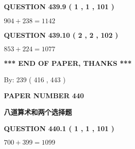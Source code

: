 \documentclass{ctexart}
\begin{document}
 
  
\vspace{0.2in}
  
{\textbf{\Large{QUESTION
439.9 
 ( 1 , 1 , 101 )
}}}
  
  
 
 

$ %
904 +  %
238=   %
1142$
 
 
  
\vspace{0.2in}
  
{\textbf{\Large{QUESTION
439.10 
 ( 2 , 2 , 102 )
}}}
  
  
 
 

$ %
853 +  %
224=   %
1077$
 
 
   
   
 \vspace{0.2in}
 
   
   
   
   
\vspace{1.0in} 
{\textbf{\large{ *** END OF PAPER, THANKS *** }}} 
   
   
\hspace{1.0in} By: 
 239 ( 416 ,  443 )
   
   
   
   
\newpage 
\setcounter{page}{ 
   440001 } 
   
   
   
   
 {\textbf{ \Large{ PAPER NUMBER  440  }}}
   
   
\vspace{0.2in}
   
   
   
   
   
   
 \vspace{0.2in}
{\LARGE {\textbf{ 八道算术和两个选择题}}}
   
   
  
\vspace{0.2in}
  
{\textbf{\Large{QUESTION
440.1 
 ( 1 , 1 , 101 )
}}}
  
  
 
 

$ %
700 +  %
399=   %
1099$
 
 
  
\vspace{0.2in}
  
\end{document}
